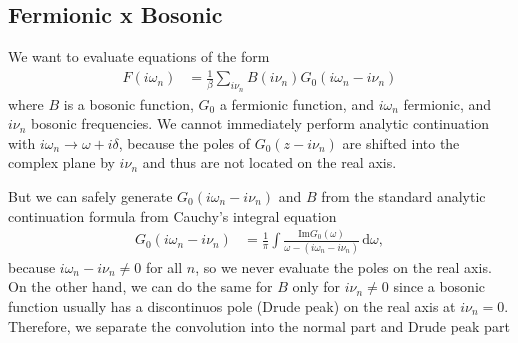 \documentclass[12pt,a4paper]{scrartcl}
\numberwithin{equation}{section}
\begin{document}
\subsection{Fermionic x Bosonic}
We want to evaluate equations of the form
\begin{align}
 F(i\omega_n)  &= \frac{1}{\beta} \sum_{i\nu_n} B(i\nu_n) G_0(i\omega_n - i\nu_n)
\end{align}
where $B$ is a bosonic function, $G_0$ a fermionic function, and $i\omega_n$ fermionic, 
and $i\nu_n$ bosonic frequencies. We cannot immediately perform 
analytic continuation with $i\omega_n \rightarrow \omega + i\delta$,
because the poles of $G_0( z - i\nu_n)$ are shifted into the complex plane by $i\nu_n$
and thus are not located on the real axis.

But we can safely generate $G_0(i\omega_n - i\nu_n)$ and $B$ from the standard analytic
continuation formula from Cauchy's integral equation 
\begin{align}
 G_0(i\omega_n - i\nu_n) &= \frac{1}{\pi} \int \frac{\mathrm{Im}G_0(\omega)}{\omega - (i\omega_n - i\nu_n)} \, \mathrm{d}\omega,
\end{align}
because $i\omega_n - i\nu_n \neq 0$ for all $n$, so we never evaluate the poles on the real axis.
On the other hand, we can do the same for $B$ only for $i\nu_n \neq 0$ since a bosonic function usually
has a discontinuos pole (Drude peak) on the real axis at $i\nu_n = 0$.
Therefore, we separate the convolution into the normal part and Drude peak part
\end{document}
